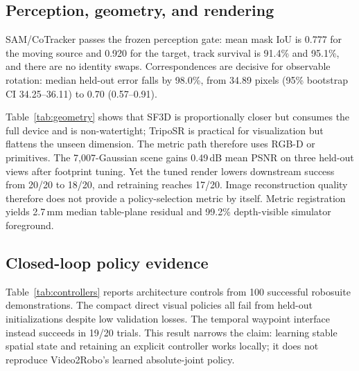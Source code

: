 \documentclass[10pt,twocolumn,letterpaper]{article}
\begin{document}
\subsection{Perception, geometry, and rendering}
SAM/CoTracker passes the frozen perception gate: mean mask IoU is 0.777 for the
moving source and 0.920 for the target, track survival is 91.4\% and 95.1\%, and
there are no identity swaps. Correspondences are decisive for observable
rotation: median held-out error falls by 98.0\%, from 34.89 pixels
(95\% bootstrap CI 34.25--36.11) to 0.70 (0.57--0.91).

\begin{table}[t]
\centering
\caption{Single-image reconstruction after longest-axis metric alignment. Both
learned meshes fail the 15\% secondary-extent gate.}
\label{tab:geometry}
\setlength{\tabcolsep}{3.2pt}
\end{table}

Table~\ref{tab:geometry} shows that SF3D is proportionally closer but consumes
the full device and is non-watertight; TripoSR is practical for visualization but
flattens the unseen dimension. The metric path therefore uses RGB-D or
primitives. The 7,007-Gaussian scene gains 0.49\,dB mean PSNR on three held-out
views after footprint tuning. Yet the tuned render lowers downstream success
from 20/20 to 18/20, and retraining reaches 17/20. Image reconstruction quality
therefore does not provide a policy-selection metric by itself. Metric
registration yields 2.7\,mm median table-plane residual and 99.2\% depth-visible
simulator foreground.

\subsection{Closed-loop policy evidence}
Table~\ref{tab:controllers} reports architecture controls from 100 successful
robosuite demonstrations. The compact direct visual policies all fail from held-out
initializations despite low validation losses. The temporal waypoint interface
instead succeeds in 19/20 trials. This result narrows the claim: learning stable
spatial state and retaining an explicit controller works locally; it does not
reproduce Video2Robo's learned absolute-joint policy.
\end{document}

